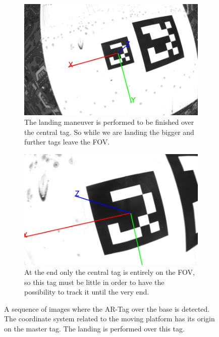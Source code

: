 \begin{figure}[!htbp]
    \begin{subfigure}[b]{0.45\textwidth}
        \includegraphics[width=\textwidth]{img/frame4.jpg}
        \caption{The landing maneuver is performed to be finished over the central tag. So while we are landing the bigger and further tags leave the FOV.  }
        \label{fig:five}
   \end{subfigure}\hfill
    \begin{subfigure}[b]{0.45\textwidth}
        \includegraphics[width=\textwidth]{img/frame5.jpg}
        \caption{At the end only the central tag is entirely on the FOV, so this tag must be little in order to have the possibility to track it until the very end.}
        \label{fig:six}
   \end{subfigure}
   
  \caption{A sequence of images where the AR-Tag over the base is detected. The coordinate system related to the moving platform has its origin on the master tag. The landing is performed over this tag.}
  \label{fig:arsys}
\end{figure} 

